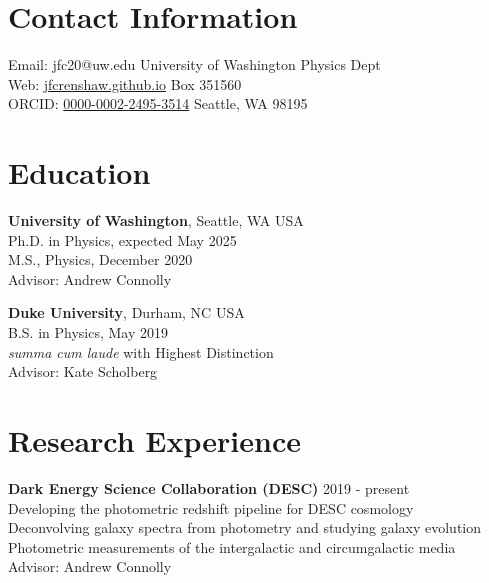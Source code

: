 \documentclass[margin, 11pt]{res}
\begin{document}

\begin{resume}

\section{Contact Information}
{Email: jfc20@uw.edu            \hfill University of Washington Physics Dept \\
Web: \href{https://jfcrenshaw.github.io}{jfcrenshaw.github.io}       \hfill Box 351560 \\
ORCID: \href{https://orcid.org/0000-0002-2495-3514} {0000-0002-2495-3514}     \hfill Seattle, WA 98195}

\section{Education}

\textbf{University of Washington}, Seattle, WA USA\\
Ph.D. in Physics, expected May 2025\\
M.S., Physics, December 2020\\
Advisor: Andrew Connolly

\textbf{Duke University}, Durham, NC USA \\
B.S. in Physics, May 2019\\
\textit{summa cum laude} with Highest Distinction \\
Advisor: Kate Scholberg

\section{Research Experience}

\textbf{Dark Energy Science Collaboration (DESC)} \hfill 2019 - present \\
Developing the photometric redshift pipeline for DESC cosmology \\
Deconvolving galaxy spectra from photometry and studying galaxy evolution \\
Photometric measurements of the intergalactic and circumgalactic media \\
Advisor: Andrew Connolly


\end{resume}
\end{document}
